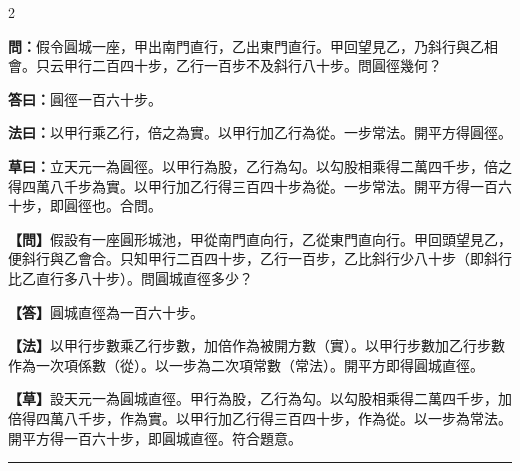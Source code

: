 \documentclass[11pt,a4paper]{article}
\newcommand{\longline}{\noindent\rule{\textwidth}{0.4pt}}
\newcommand{\wenC}[1]{\par\noindent\textbf{\textcolor{probcolor}{問：}}{#1}\par}
\newcommand{\daC}[1]{\par\noindent\textbf{\textcolor{anscolor}{答曰：}}{#1}\par}
\newcommand{\fayueC}[1]{\par\noindent\textbf{\textcolor{methodcolor}{法曰：}}{#1}\par}
\newcommand{\caoyueC}[1]{\par\noindent\textbf{草曰：}{#1}\par}
\newcommand{\wenM}[1]{\par\noindent\textbf{\textcolor{probcolor}{【問】}}{#1}\par}
\newcommand{\daM}[1]{\par\noindent\textbf{\textcolor{anscolor}{【答】}}{#1}\par}
\newcommand{\fayueM}[1]{\par\noindent\textbf{\textcolor{methodcolor}{【法】}}{#1}\par}
\newcommand{\caoyueM}[1]{\par\noindent\textbf{【草】}{#1}\par}
\begin{document}
\begin{paracol}{2}

\wenC{假令圓城一座，甲出南門直行，乙出東門直行。甲回望見乙，乃斜行與乙相會。只云甲行二百四十步，乙行一百步不及斜行八十步。問圓徑幾何？}

\daC{圓徑一百六十步。}

\fayueC{以甲行乘乙行，倍之為實。以甲行加乙行為從。一步常法。開平方得圓徑。}

\caoyueC{立天元一為圓徑。以甲行為股，乙行為勾。以勾股相乘得二萬四千步，倍之得四萬八千步為實。以甲行加乙行得三百四十步為從。一步常法。開平方得一百六十步，即圓徑也。合問。}

\switchcolumn

\wenM{假設有一座圓形城池，甲從南門直向行，乙從東門直向行。甲回頭望見乙，便斜行與乙會合。只知甲行二百四十步，乙行一百步，乙比斜行少八十步（即斜行比乙直行多八十步）。問圓城直徑多少？}

\daM{圓城直徑為一百六十步。}

\fayueM{以甲行步數乘乙行步數，加倍作為被開方數（實）。以甲行步數加乙行步數作為一次項係數（從）。以一步為二次項常數（常法）。開平方即得圓城直徑。}

\caoyueM{設天元一為圓城直徑。甲行為股，乙行為勾。以勾股相乘得二萬四千步，加倍得四萬八千步，作為實。以甲行加乙行得三百四十步，作為從。以一步為常法。開平方得一百六十步，即圓城直徑。符合題意。}

\end{paracol}

\vspace{0.3cm}
\longline
\end{document}
